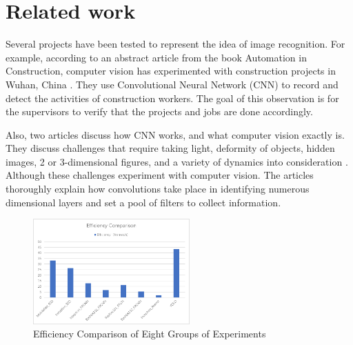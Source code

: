 \section{Related work}
 
Several projects have been tested to represent the idea of image recognition. For example,  according to an abstract article from the book Automation in Construction, computer vision has experimented with construction projects in Wuhan, China \cite{Luo}. They use Convolutional Neural Network (CNN) to record and detect the activities of construction workers. The goal of this observation is for the supervisors to verify that the projects and jobs are done accordingly.

Also, two articles discuss how CNN works, and what computer vision exactly is. They discuss challenges that require taking light, deformity of objects, hidden images, 2 or 3-dimensional figures, and a variety of dynamics into consideration \cite{Bansac}. Although these challenges experiment with computer vision. The articles thoroughly explain how convolutions take place in identifying numerous dimensional layers and set a pool of filters to collect information.

\begin{figure}
    \centering
    \includegraphics[width=6cm]{Security Object Detection, Surveillance/Latex/figures/fig3.png}
    \caption{Efficiency Comparison of Eight Groups of Experiments \cite{Xie}}
    \label{fig:fig1}
\end{figure}

